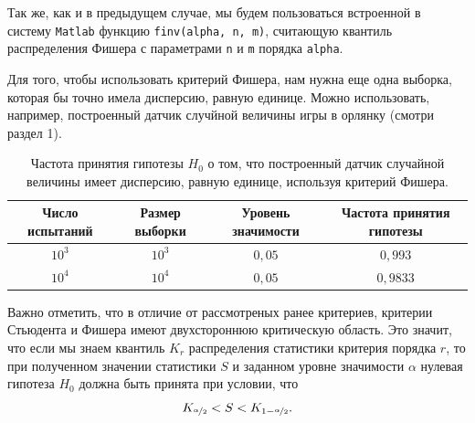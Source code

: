 \begin{remark}
        Так же, как и в предыдущем случае, мы будем пользоваться встроенной в систему \texttt{Matlab} функцию \texttt{finv(alpha, n, m)}, считающую квантиль распределения Фишера с параметрами \texttt{n} и \texttt{m} порядка \texttt{alpha}. 
\end{remark}

\begin{remark}
        Для того, чтобы использовать критерий Фишера, нам нужна еще одна выборка, которая бы точно имела дисперсию, равную единице. Можно использовать, например, построенный датчик случйной величины игры в орлянку (смотри раздел 1). 
\end{remark}

\begin{table}[h]
\begin{center}
\begin{tabular}{|c|c|c|c|}
\hline
Число испытаний &
Размер выборки  &
Уровень значимости &
Частота принятия гипотезы
\\
\hline
$10^3$
&
$10^3$
&
$0,05$
&
$0,993$
\\
\hline
$10^4$
&
$10^4$
&
$0,05$
&
$0,9833$
\\
\hline
\end{tabular}
\end{center}
\caption{Частота принятия гипотезы $H_0$ о том, что построенный датчик случайной величины имеет дисперсию, равную единице, используя критерий Фишера.}
\end{table}

Важно отметить, что в отличие от рассмотреных ранее критериев, критерии Стьюдента и Фишера имеют двухстороннюю критическую область. Это значит, что если мы знаем квантиль $K_r$ распределения статистики критерия порядка $r$, то при полученном значении статистики $S$ и заданном уровне значимости $\alpha$ нулевая гипотеза $H_0$ должна быть принята при условии, что
$$
        K_{\nicefrac{\alpha}{2}} < S < K_{1 - \nicefrac{\alpha}{2}}.
$$

